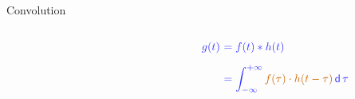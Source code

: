 \begin{frame}[t]{Convolution}
\begin{center}
\begin{columns}[t, onlytextwidth]
\begin{column}{0.5\textwidth}
            \end{column}%

            \begin{column}{0.5\textwidth}
                \centering{}
                \only<1>{\scalebox{0.5}{}}%
                \begin{align*}
                    \textcolor{blue!80}{g(t)~} & \textcolor{blue!80}{= f(t) \ast h(t)}                                                                                   \\[0.2cm]
                                               & \textcolor{blue!80}{= \int_{-\infty}^{+\infty} \textcolor{orange!80!black}{f(\tau) \cdot h(t-\tau)}\, \mathsf{d}\,\tau}
                \end{align*}

            \end{column}
        \end{columns}
    \end{center}
\end{frame}

